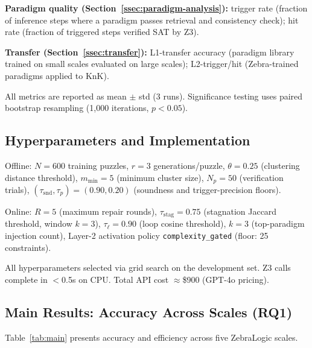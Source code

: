 \textbf{Paradigm quality (Section~\ref{ssec:paradigm-analysis}):} trigger rate (fraction of inference steps where a paradigm passes retrieval and consistency check); hit rate (fraction of triggered steps verified SAT by Z3).

\textbf{Transfer (Section~\ref{ssec:transfer}):} L1-transfer accuracy (paradigm library trained on small scales evaluated on large scales); L2-trigger/hit (Zebra-trained paradigms applied to KnK).

All metrics are reported as mean $\pm$ std (3 runs). Significance testing uses paired bootstrap resampling (1,000 iterations, $p < 0.05$).

\subsection{Hyperparameters and Implementation}

Offline: $N = 600$ training puzzles, $r = 3$ generations/puzzle, $\theta = 0.25$ (clustering distance threshold), $m_{\min} = 5$ (minimum cluster size), $N_p = 50$ (verification trials), $(\tau_{\text{snd}}, \tau_p) = (0.90, 0.20)$ (soundness and trigger-precision floors).

Online: $R = 5$ (maximum repair rounds), $\tau_{\text{stag}} = 0.75$ (stagnation Jaccard threshold, window $k = 3$), $\tau_\ell = 0.90$ (loop cosine threshold), $k = 3$ (top-paradigm injection count), Layer-2 activation policy \texttt{complexity\_gated} (floor: 25 constraints).

All hyperparameters selected via grid search on the development set. Z3 calls complete in $<$0.5s on CPU. Total API cost $\approx$\$900 (GPT-4o pricing).

\subsection{Main Results: Accuracy Across Scales (RQ1)}

Table~\ref{tab:main} presents accuracy and efficiency across five ZebraLogic scales.

